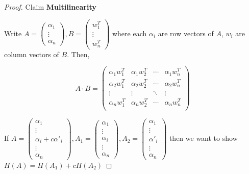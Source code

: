 \begin{proof} {Claim}
    \textbf{Multilinearity}

    Write \(A = \begin{pmatrix}
        \alpha_1 \\
        \vdots   \\
        \alpha_n
    \end{pmatrix}, B = \begin{pmatrix}
        w_1^T  \\
        \vdots \\
        w_n^T
    \end{pmatrix}\) where each \(\alpha_i\) are row vectors of \(A\), \(w_i\) are column vectors of \(B\). Then,

    \[
        A \cdot B = \begin{pmatrix}
            \alpha_1 w_1^T & \alpha_1 w_2^T & \cdots & \alpha_1 w_n^T \\
            \alpha_2 w_1^T & \alpha_2 w_2^T & \cdots & \alpha_2 w_n^T \\
            \vdots         & \vdots         & \ddots & \vdots         \\
            \alpha_n w_1^T & \alpha_n w_2^T & \cdots & \alpha_n w_n^T \\
        \end{pmatrix}
    \]

    If \(A = \begin{pmatrix}
        \alpha_1              \\
        \vdots                \\
        \alpha_i + c\alpha'_i \\
        \vdots                \\
        \alpha_n
    \end{pmatrix}, A_1 = \begin{pmatrix}
        \alpha_1 \\
        \vdots   \\
        \alpha_i \\
        \vdots   \\
        \alpha_n
    \end{pmatrix}, A_2 = \begin{pmatrix}
        \alpha_1  \\
        \vdots    \\
        \alpha'_i \\
        \vdots    \\
        \alpha_n
    \end{pmatrix}\) then we want to show \(H(A) = H(A_1) + cH(A_2)\)


\end{proof}
